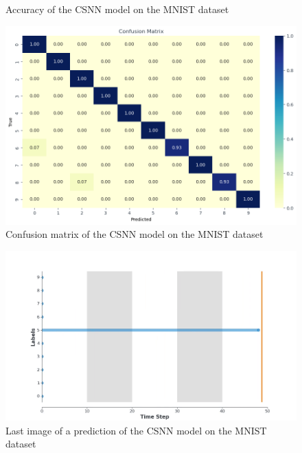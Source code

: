 \documentclass[11pt]{article}
\begin{document}
\begin{figure}[H]
\begin{minipage}{0.5\textwidth}
\begin{center}
      \caption{Accuracy of the CSNN model on the MNIST dataset}
      \label{fig:accuracy_MNIST}
    \end{center}
  \end{minipage}
\end{figure}

\begin{figure}[H]
  \begin{center}
    \includegraphics[width=\textwidth]{image/confusion_mat_MNIST.png}
    \caption{Confusion matrix of the CSNN model on the MNIST dataset}
    \label{fig:confusion_matrix_MNIST}
  \end{center}
\end{figure}

\begin{figure}[H]
  \begin{center}
    \includegraphics[width=\textwidth]{image/mnist2_050.png}
    \caption{Last image of a prediction of the CSNN model on the MNIST dataset}
    \label{fig:mnist2}
  \end{center}
\end{figure}
\end{document}
